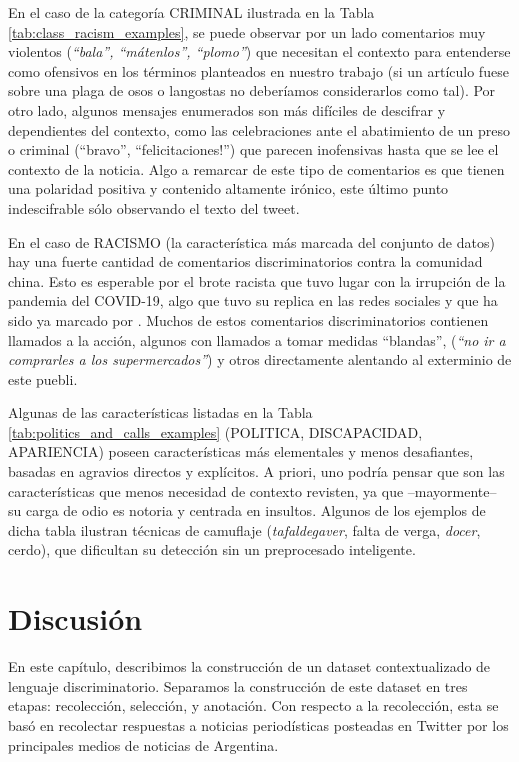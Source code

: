 En el caso de la categoría CRIMINAL ilustrada en la Tabla \ref{tab:class_racism_examples}, se puede observar por un lado comentarios muy violentos (\emph{``bala'', ``mátenlos'', ``plomo''}) que necesitan el contexto para entenderse como ofensivos en los términos planteados en nuestro trabajo (si un artículo fuese sobre una plaga de osos o langostas no deberíamos considerarlos como tal). Por otro lado, algunos mensajes enumerados son más difíciles de descifrar y dependientes del contexto, como las celebraciones ante el abatimiento de un preso o criminal (``bravo'', ``felicitaciones!'') que parecen inofensivas hasta que se lee el contexto de la noticia. Algo a remarcar de este tipo de comentarios es que tienen una polaridad positiva y contenido altamente irónico, este último punto indescifrable sólo observando el texto del tweet.

En el caso de RACISMO (la característica más marcada del conjunto de datos) hay una fuerte cantidad de comentarios discriminatorios contra la comunidad china. Esto es esperable por el brote racista que tuvo lugar con la irrupción de la pandemia del COVID-19, algo que tuvo su replica en las redes sociales y que ha sido ya marcado por \citet{he2021racism}. Muchos de estos comentarios discriminatorios contienen llamados a la acción, algunos con llamados a tomar medidas ``blandas'', (\emph{``no ir a comprarles a los supermercados''}) y otros directamente alentando al exterminio de este puebli.

Algunas de las características listadas en la Tabla \ref{tab:politics_and_calls_examples} (POLITICA, DISCAPACIDAD, APARIENCIA) poseen características más elementales y menos desafiantes, basadas en agravios directos y explícitos. A priori, uno podría pensar que son las características que menos necesidad de contexto revisten, ya que --mayormente-- su carga de odio es notoria y centrada en insultos. Algunos de los ejemplos de dicha tabla ilustran técnicas de camuflaje (\emph{tafaldegaver}, falta de verga, \emph{docer}, cerdo), que dificultan su detección sin un preprocesado inteligente.


\section{Discusión}

En este capítulo, describimos la construcción de un dataset contextualizado de lenguaje discriminatorio. Separamos la construcción de este dataset en tres etapas: recolección, selección, y anotación. Con respecto a la recolección, esta se basó en recolectar respuestas a noticias periodísticas posteadas en Twitter por los principales medios de noticias de Argentina.

